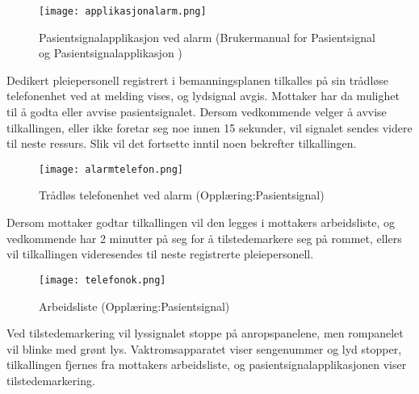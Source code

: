 \begin{figure}[H]
\centering
\texttt{[image: applikasjonalarm.png]}
\caption{Pasientsignalapplikasjon ved alarm (Brukermanual for Pasientsignal og Pasientsignalapplikasjon )}
\label{alarmprosess}
\end{figure}
\noindent
Dedikert pleiepersonell registrert i bemanningsplanen tilkalles på sin trådløse telefonenhet ved at melding vises, og lydsignal avgis. Mottaker har da mulighet til å godta eller avvise pasientsignalet. Dersom vedkommende velger å avvise tilkallingen, eller ikke foretar seg noe innen 15 sekunder, vil signalet sendes videre til neste ressurs. Slik vil det fortsette inntil noen bekrefter tilkallingen.
\begin{figure}[H]
\centering
\texttt{[image: alarmtelefon.png]}
\caption{Trådløs telefonenhet ved alarm (Opplæring:Pasientsignal)}
\label{alarmprosess}
\end{figure}
\noindent
Dersom mottaker godtar tilkallingen vil den legges i mottakers arbeidsliste, og vedkommende har 2 minutter på seg for å tilstedemarkere seg på rommet, ellers vil tilkallingen videresendes til neste registrerte pleiepersonell.
\begin{figure}[H]
\centering
\texttt{[image: telefonok.png]}
\caption{Arbeidsliste (Opplæring:Pasientsignal)}
\label{alarmprosess}
\end{figure}
\noindent
Ved tilstedemarkering vil lyssignalet stoppe på anropspanelene, men rompanelet vil blinke med grønt lys. Vaktromsapparatet viser sengenummer og lyd stopper, tilkallingen fjernes fra mottakers arbeidsliste, og pasientsignalapplikasjonen viser tilstedemarkering.
 
